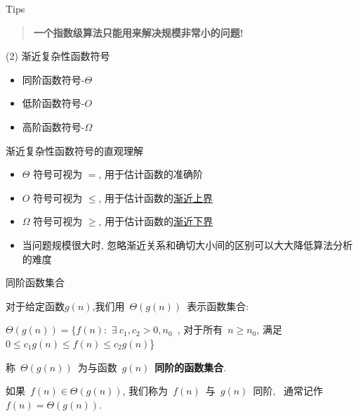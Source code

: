 \documentclass[fontset=fandol,UTF8,12pt,aspectratio=169,fleqn]{beamer}
\begin{document}
\begin{frame}{Tips}
\vspace*{1cm}
\begin{quote}
  \centering
  \large{\textbf{一个指数级算法只能用来解决规模非常小的问题!}}
\end{quote}
\end{frame}

\begin{frame}{(2) 渐近复杂性函数符号}
\begin{itemize}[<+-|alert@+>]
\item 同阶函数符号-$\Theta$
\item 低阶函数符号-$O$
\item 高阶函数符号-$\Omega$
\end{itemize}
\end{frame}

\begin{frame}{渐近复杂性函数符号的直观理解}
\begin{itemize}[<+-|alert@+>]
\item $\Theta$ 符号可视为 $=$, 用于估计函数的准确阶   
\item $O$ 符号可视为 $\leq$, 用于估计函数的\underline{渐近上界}   
\item $\Omega$ 符号可视为 $\geq$, 用于估计函数的\underline{渐近下界}   
\item 当问题规模很大时, 忽略渐近关系和确切大小间的区别可以大大降低算法分析的难度  
\end{itemize}
\end{frame}

\begin{frame}{同阶函数集合}

\begin{definition}[同阶函数集合]
对于给定函数$g(n)$,我们用~$\Theta(g(n))$~表示函数集合: 
\begin{center}
  $\Theta(g(n))=\{f(n):$ $\exists\ c_1, c_2 >0, n_0$~, 对于所有~$n\geq n_0$, 满足~$0\leq c_1g(n) \leq f(n)\leq c_2g(n)$\} 
\end{center}
称~$\Theta(g(n))$~为与函数~$g(n)$~\textbf{同阶的函数集合}.  
 
如果~$f(n) \in \Theta(g(n))$, 我们称为~$f(n)$~与~$g(n)$~同阶,
 ~通常记作~$f(n)=\Theta(g(n))$.
\end{definition}
\end{frame}
\end{document}
